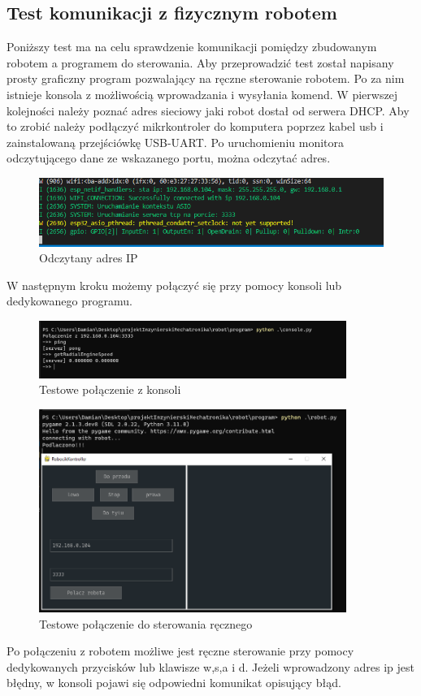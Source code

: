 \subsection{Test komunikacji z fizycznym robotem}
Poniższy test ma na celu sprawdzenie komunikacji pomiędzy zbudowanym robotem a programem do sterowania. 
Aby przeprowadzić test został napisany prosty graficzny program pozwalający na ręczne sterowanie robotem. 
Po za nim istnieje konsola z możliwością wprowadzania i wysyłania komend.
W pierwszej kolejności należy poznać adres sieciowy jaki robot dostał od serwera DHCP. Aby to zrobić 
należy podłączyć mikrkontroler do komputera poprzez kabel usb i zainstalowaną przejściówkę USB-UART. 
Po uruchomieniu monitora odczytującego dane ze wskazanego portu, można odczytać adres. 
\begin{figure}[H]
	\centering
	\includegraphics[width=14cm]{pages/testy/zdjecia/testSiec/idfMonitorIP.png}
	\caption{Odczytany adres IP}
\end{figure}
W następnym kroku możemy połączyć się przy pomocy konsoli lub dedykowanego programu. 
\begin{figure}[H]
	\centering
	\includegraphics[width=10cm]{pages/testy/zdjecia/testSiec/testSiecKonsolePing.png}
	\caption{Testowe połączenie z konsoli}
\end{figure}

\begin{figure}[H]
	\centering
	\includegraphics[width=10cm]{pages/testy/zdjecia/testSiec/testSterowanieReczne.png}
	\caption{Testowe połączenie do sterowania ręcznego}
\end{figure}

Po połączeniu z robotem możliwe jest ręczne sterowanie przy pomocy dedykowanych przycisków lub klawisze w,s,a i d.
Jeżeli wprowadzony adres ip jest błędny, w konsoli pojawi się odpowiedni komunikat opisujący błąd. 